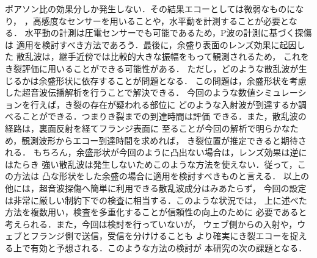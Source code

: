 ポアソン比の効果分しか発生しない．その結果エコーとしては微弱なものになり，
，高感度なセンサーを用いることや，水平動を計測することが必要となる．
水平動の計測は圧電センサーでも可能であるため，P波の計測に基づく探傷は
適用を検討すべき方法であろう．最後に，余盛り表面のレンズ効果に起因した
散乱波は，継手近傍では比較的大きな振幅をもって観測されるため，
これをき裂評価に用いることができる可能性がある．
ただし，どのような散乱波が生じるかは余盛形状に依存することが問題となる．
この問題は，余盛形状を考慮した超音波伝播解析を行うことで解決できる．
今回のような数値シミュレーションを行えば，き裂の存在が疑われる部位に
どのような入射波が到達するか調べることができる．つまりき裂までの到達時間は評価
できる．また，散乱波の経路は，裏面反射を経てフランジ表面に
至ることが今回の解析で明らかなため，観測波形からエコー到達時間を求めれば，
き裂位置が推定できると期待される．
もちろん，余盛形状が今回のように凸出ない場合は，レンズ効果は逆にはたらき
強い散乱波は発生しないためこのような方法を使えない．従って，この方法は
凸な形状をした余盛の場合に適用を検討すべきものと言える．
以上の他には，超音波探傷へ簡単に利用できる散乱波成分はみあたらず，
今回の設定は非常に厳しい制約下での検査に相当する．このような状況では，
上に述べた方法を複数用い，検査を多重化することが信頼性の向上のために
必要であると考えられる．また，今回は検討を行っていないが，
ウェブ側からの入射や，ウェブとフランジ側で送信，受信を分けけることも
より確実にき裂エコーを捉える上で有効と予想される．このような方法の検討が
本研究の次の課題となる．


